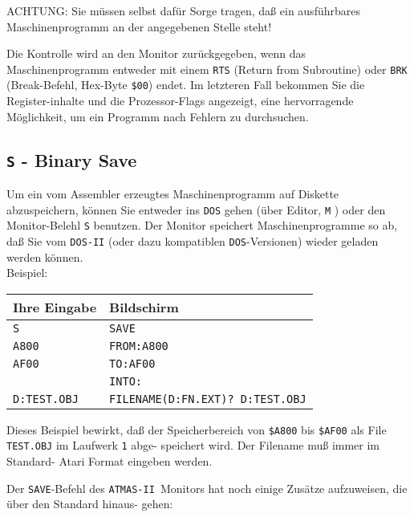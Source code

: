 \documentclass[10pt,a4paper,twoside,final,openright,titlepage]{memoir}
\def\atmas{\texttt{AT\-MAS-II }}
\newcommand{\key}[1]{\keystroke{\tiny #1}}
\begin{document}
ACHTUNG: Sie müssen selbst dafür Sorge tragen, daß ein
ausführbares Maschinenprogramm an der angegebenen
Stelle steht!

Die Kontrolle wird an den Monitor zurückgegeben, wenn
das Maschinenprogramm entweder mit einem \texttt{RTS} (Return
from Subroutine) oder \texttt{BRK} (Break-Befehl, Hex-Byte \texttt{\$00})
endet. Im letzteren Fall bekommen Sie die Register-inhalte und die Prozessor-Flags angezeigt, eine
hervorragende Möglichkeit, um ein Programm nach Fehlern
zu durchsuchen.

\subsection{\texttt{S} - Binary Save}

Um ein vom Assembler erzeugtes Maschinenprogramm auf
Diskette abzuspeichern, können Sie entweder ins \texttt{DOS}
gehen (über Editor, \key{ESC} \texttt{M} \key{ESC} \key{ESC}) oder den
Monitor-Belehl \texttt{S} benutzen. Der Monitor speichert
Maschinenprogramme so ab, daß Sie vom \texttt{DOS-II} (oder
dazu kompatiblen \texttt{DOS}-Versionen) wieder geladen werden
können.\\

Beispiel: \\

\renewcommand{\arraystretch}{1.2}
\begin{tabular}{p{10em}p{16em}}
Ihre Eingabe			& Bildschirm \\ \hline
\texttt{S}				& \texttt{SAVE} \\
\texttt{A800}			& \texttt{FROM:A800} \\
\texttt{AF00}			& \texttt{TO:AF00} \\
\key{RETURN}			& \texttt{INTO:} \\
\texttt{D:TEST.OBJ}		& \texttt{FILENAME(D:FN.EXT)? D:TEST.OBJ} \\
\end{tabular}
\renewcommand{\arraystretch}{1.8}
\bigskip

Dieses Beispiel bewirkt, daß der Speicherbereich von
\texttt{\$A800} bis \texttt{\$AF00} als File \texttt{TEST.OBJ} im Laufwerk \texttt{1} abge-
speichert wird. Der Filename muß immer im Standard-
Atari Format eingeben werden.

Der \texttt{SAVE}-Befehl des \atmas Monitors hat noch einige
Zusätze aufzuweisen, die über den Standard hinaus-
gehen:
\end{document}
